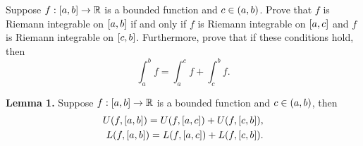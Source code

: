\begin{exercise}\label{chapter1:sectionA:exercise10}
    Suppose $f: \left[{a,b}\right]\to\mathbb{R}$ is a bounded function and $c\in\left({a,b}\right)$. Prove that $f$ is Riemann integrable on $\left[{a,b}\right]$ if and only if $f$ is Riemann integrable on $\left[{a,c}\right]$ and $f$ is Riemann integrable on $\left[{c,b}\right]$. Furthermore, prove that if these conditions hold, then
    \[
        \int^{b}_{a}f = \int^{c}_{a}f + \int^{b}_{c}f.
    \]
\end{exercise}

\noindent\textbf{Lemma 1.} Suppose $f: \left[{a,b}\right]\to\mathbb{R}$ is a bounded function and $c\in\left({a,b}\right)$, then
\[
    \begin{split}
        U(f, \left[{a, b}\right]) = U(f, \left[{a, c}\right]) + U(f, \left[{c, b}\right]), \\
        L(f, \left[{a, b}\right]) = L(f, \left[{a, c}\right]) + L(f, \left[{c, b}\right]).
    \end{split}
\]

